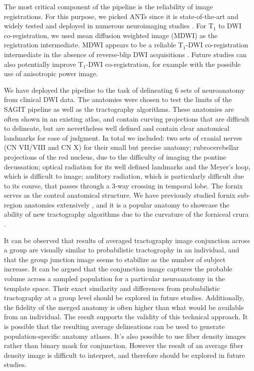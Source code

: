 The most critical component of the pipeline is the reliability of image registrations. For this purpose, we picked ANTs since it is state-of-the-art and widely tested and deployed in numerous neuroimaging studies \cite{Avants2011,Klein2009}. For T$_1$ to DWI co-registration, we used mean diffusion weighted image (MDWI) as the registration intermediate. MDWI appears to be a reliable T$_1$-DWI co-registration intermediate in the absence of reverse-blip DWI acquisitions \cite{Chen2015b}. Future studies can also potentially improve T$_1$-DWI co-registration, for example with the possible use of anisotropic power image\cite{DellAcqua2014}. 

We have deployed the pipeline to the task of delineating 6 sets of neuroanatomy from clinical DWI data. The anatomies were chosen to test the limits of the SAGIT pipeline as well as the tractography algorithms. These anatomies are often shown in an existing atlas, and contain curving projections that are difficult to delineate, but are nevertheless well defined and contain clear anatomical landmarks for ease of judgment. In total we included: two sets of cranial nerves (CN VII/VIII and CN X) for their small but precise anatomy; rubrocerebellar projections of the red nucleus, due to the difficulty of imaging the pontine decussation; optical radiation for its well defined landmarks and the Meyer's loop, which is difficult to image; auditory radiation, which is particularly difficult due to its course, that passes through a 3-way crossing in temporal lobe. The fornix serves as the control anatomical structure. We have previously studied fornix sub-region anatomies extensively \cite{Chen2015c}, and it is a popular anatomy to showcase the ability of new tractography algorithms due to the curvature of the forniceal crura \cite{Garyfallidis2014}. 

It can be observed that results of averaged tractography image conjunction across a group are visually similar to probabilistic tractography in an individual, and that the group junction image seems to stabilize as the number of subject increase. It can be argued that the conjunction image captures the probable volume across a sampled population for a particular neuroanatomy in the template space. Their exact similarity and differences from probabilistic tractography at a group level should be explored in future studies. Additionally, the fidelity of the merged anatomy is often higher than what would be available from an individual. The result supports the validity of this technical approach. It is possible that the resulting average delineations can be used to generate population-specific anatomy atlases. It's also possible to use fiber density images rather than binary mask for conjunction. However the result of an average fiber density image is difficult to interpret, and therefore should be explored in future studies.

